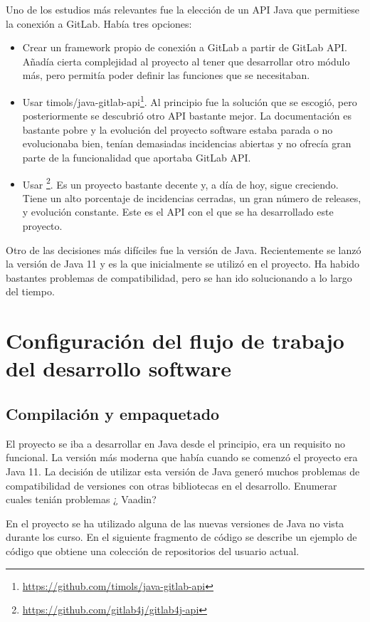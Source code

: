 Uno de los estudios más relevantes fue la elección de un API Java que permitiese la conexión a GitLab. Había tres opciones:
\begin{itemize}
	\item Crear un framework propio de conexión a GitLab a partir de GitLab API. Añadía cierta complejidad al proyecto al tener que desarrollar otro módulo más, pero permitía poder definir las funciones que se necesitaban.
	\item Usar timols/java-gitlab-api\footnote{\url{https://github.com/timols/java-gitlab-api}}\cite{olshansky_wrapper_2019}. Al principio fue la solución que se escogió, pero posteriormente se descubrió otro API bastante mejor. La documentación es bastante pobre y la evolución del proyecto software estaba parada o no evolucionaba bien, tenían demasiadas incidencias abiertas y no ofrecía gran parte de la funcionalidad que aportaba GitLab API.
	\item  Usar \footnote{\url{https://github.com/gitlab4j/gitlab4j-api}}\cite{noauthor_gitlab4j_2019}. Es un proyecto bastante decente y, a día de hoy, sigue creciendo. Tiene un alto porcentaje de incidencias cerradas, un gran número de releases, y evolución constante. Este es el API con el que se ha desarrollado este proyecto.
\end{itemize}
Otro de las decisiones más difíciles fue la versión de Java. Recientemente se lanzó la versión de Java 11 y es la que inicialmente se utilizó en el proyecto. Ha habido bastantes problemas de compatibilidad, pero se han ido solucionando a lo largo del tiempo.
\section{Configuración del flujo de trabajo del desarrollo software}
\subsection{Compilación y empaquetado}

El proyecto se iba a desarrollar en Java desde el principio, era un requisito no funcional. La versión más moderna que había cuando se comenzó el proyecto era Java 11. La decisión de utilizar esta versión de Java generó muchos problemas de compatibilidad de versiones con  otras bibliotecas en el desarrollo. 
\todo Enumerar cuales tenián problemas ¿ Vaadin?

En el proyecto se ha utilizado alguna de las nuevas versiones de Java no vista durante los curso. En el siguiente fragmento de código se describe 
un ejemplo de código que obtiene una colección de repositorios del usuario actual.

